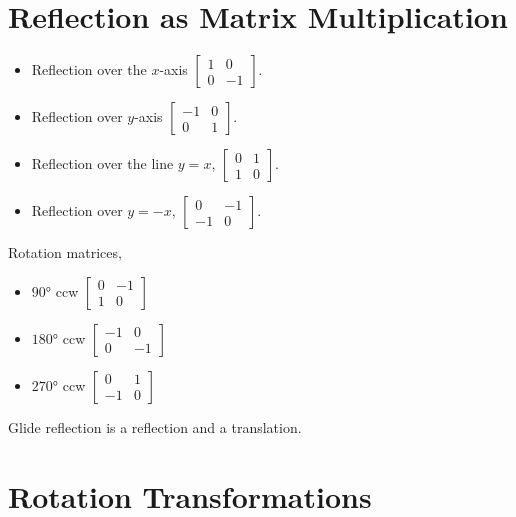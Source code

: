 \documentclass[letterpaper,12pt]{article}
\begin{document}
\section*{Reflection as Matrix Multiplication}
\begin{itemize}
    \item Reflection over the $x$-axis $\begin{bmatrix} 1 & 0 \\ 0 & -1 \end{bmatrix}$.
    \item Reflection over $y$-axis $\begin{bmatrix} -1 & 0 \\ 0 & 1 \end{bmatrix}$.
    \item Reflection over the line $y = x$, $\begin{bmatrix} 0 & 1 \\ 1 & 0 \end{bmatrix}$.
    \item Reflection over $y = -x$, $\begin{bmatrix} 0 & -1 \\ -1 & 0 \end{bmatrix}$.
\end{itemize}
Rotation matrices,
\begin{itemize}
    \item $\ang{90}$ ccw $\begin{bmatrix} 0 & -1 \\ 1 & 0 \end{bmatrix}$
    \item $\ang{180}$ ccw $\begin{bmatrix} -1 & 0 \\ 0 & -1 \end{bmatrix}$
    \item $\ang{270}$ ccw $\begin{bmatrix} 0 & 1 \\ -1 & 0 \end{bmatrix}$
\end{itemize}
Glide reflection is a reflection and a translation.

\section*{Rotation Transformations}
\end{document}
